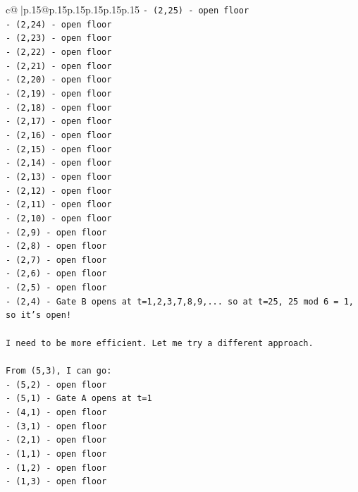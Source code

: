 \documentclass{article}
\begin{document}
{\begin{supertabular}{c@{$\;$}|p{.15\linewidth}@{}p{.15\linewidth}p{.15\linewidth}p{.15\linewidth}p{.15\linewidth}p{.15\linewidth}}
{{{\texttt{{-} (2,25) {-} open floor} \\
\texttt{{-} (2,24) {-} open floor} \\
\texttt{{-} (2,23) {-} open floor} \\
\texttt{{-} (2,22) {-} open floor} \\
\texttt{{-} (2,21) {-} open floor} \\
\texttt{{-} (2,20) {-} open floor} \\
\texttt{{-} (2,19) {-} open floor} \\
\texttt{{-} (2,18) {-} open floor} \\
\texttt{{-} (2,17) {-} open floor} \\
\texttt{{-} (2,16) {-} open floor} \\
\texttt{{-} (2,15) {-} open floor} \\
\texttt{{-} (2,14) {-} open floor} \\
\texttt{{-} (2,13) {-} open floor} \\
\texttt{{-} (2,12) {-} open floor} \\
\texttt{{-} (2,11) {-} open floor} \\
\texttt{{-} (2,10) {-} open floor} \\
\texttt{{-} (2,9) {-} open floor} \\
\texttt{{-} (2,8) {-} open floor} \\
\texttt{{-} (2,7) {-} open floor} \\
\texttt{{-} (2,6) {-} open floor} \\
\texttt{{-} (2,5) {-} open floor} \\
\texttt{{-} (2,4) {-} Gate B opens at t=1,2,3,7,8,9,... so at t=25, 25 mod 6 = 1, so it's open!} \\
\\ 
\texttt{I need to be more efficient. Let me try a different approach.} \\
\\ 
\texttt{From (5,3), I can go:} \\
\texttt{{-} (5,2) {-} open floor} \\
\texttt{{-} (5,1) {-} Gate A opens at t=1} \\
\texttt{{-} (4,1) {-} open floor} \\
\texttt{{-} (3,1) {-} open floor} \\
\texttt{{-} (2,1) {-} open floor} \\
\texttt{{-} (1,1) {-} open floor} \\
\texttt{{-} (1,2) {-} open floor} \\
\texttt{{-} (1,3) {-} open floor} \\
}}}
\end{supertabular}}
\end{document}
